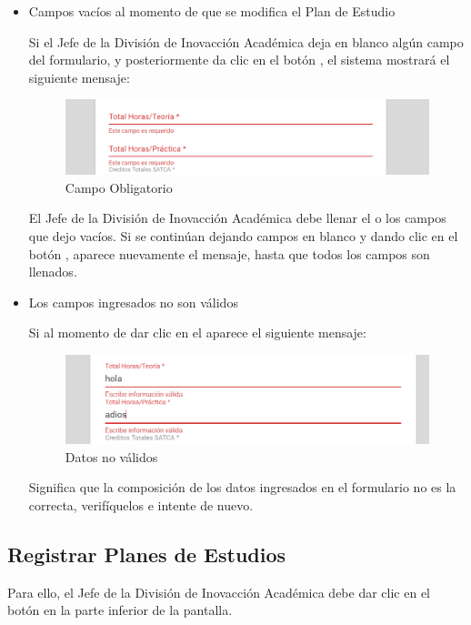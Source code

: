 \begin{itemize}
	\item Campos vacíos al momento de que se modifica el Plan de Estudio

	Si el Jefe de la División de Inovacción Académica deja en blanco algún campo del formulario, y posteriormente da clic en el botón  , el sistema mostrará el siguiente mensaje:

		\begin{figure}[H]
		\centering
		\hypertarget{ms4}{\includegraphics[width=0.7\linewidth]{images/SP4-GPE/m4}}
		\caption{Campo Obligatorio}
		\label{ms4}
	\end{figure}

	 El Jefe de la División de Inovacción Académica debe llenar el o los campos que dejo vacíos. Si se continúan dejando campos en blanco y dando clic en el botón  , aparece nuevamente el mensaje, hasta que todos los campos son llenados.


	\item Los campos ingresados no son válidos

	Si al momento de dar clic en el  aparece el siguiente mensaje:
	\begin{figure}[H]
		\centering
		\hypertarget{ms5}{\includegraphics[width=0.7\linewidth]{images/SP4-GPE/m5}}
		\caption{Datos no válidos}
		\label{ms5}
	\end{figure}

	Significa que la composición de los datos ingresados en el formulario no es la correcta, verifíquelos e intente de nuevo.

\end{itemize}


\newpage
\subsection{Registrar Planes de Estudios}

Para ello, el Jefe de la División de Inovacción Académica debe dar clic en el botón \IUbutton{+} en la parte inferior de la pantalla.

